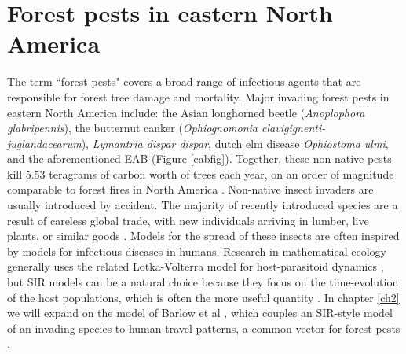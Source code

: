\section{Forest pests in eastern North America}
The term ``forest pests" covers a broad range of infectious agents that are responsible for forest tree damage and mortality. Major invading forest pests in eastern North America include: the Asian longhorned beetle (\textit{Anoplophora glabripennis}), the butternut canker (\textit{Ophiognomonia clavigignenti-juglandacearum}), \textit{Lymantria dispar dispar}, dutch elm disease \textit{Ophiostoma ulmi}, and the aforementioned EAB (Figure \ref{eabfig}). Together, these non-native pests kill 5.53 teragrams of carbon worth of trees each year, on an order of magnitude comparable to forest fires in North America \cite{fei2019biomass}. Non-native insect invaders are usually introduced by accident. The majority of recently introduced species are a result of careless global trade, with new individuals arriving in lumber, live plants, or similar goods \cite{brockerhoff2017ecology}. Models for the spread of these insects are often inspired by models for infectious diseases in humans. Research in mathematical ecology generally uses the related Lotka-Volterra model for host-parasitoid dynamics \cite{edelstein2005mathematical}, but SIR models can be a natural choice because they focus on the time-evolution of the host populations, which is often the more useful quantity \cite{edelstein2005mathematical}. In chapter \ref{ch2} we will expand on the model of Barlow et al \cite{barlow2014modelling}, which couples an SIR-style model of an invading species to human travel patterns, a common vector for forest pests \cite{buck2009hitchhiking,kolar2001progress,wilson2009something}.


